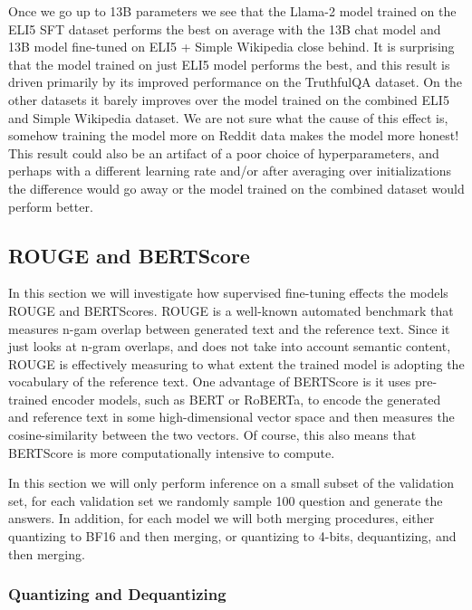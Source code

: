 \documentclass[11pt, oneside]{article}   	%
\begin{document}
Once we go up to 13B parameters we see that the Llama-2 model trained on the ELI5 SFT dataset performs the best on average with the 13B chat model and 13B model fine-tuned on ELI5 + Simple Wikipedia close behind.
It is surprising that the model trained on just ELI5 model performs the best, and this result is driven primarily by its improved performance on the TruthfulQA dataset. 
On the other datasets it barely improves over the model trained on the combined ELI5 and Simple Wikipedia dataset.
We are not sure what the cause of this effect is, somehow training the model more on Reddit data makes the model more honest!
This result could also be an artifact of a poor choice of hyperparameters, and perhaps with a different learning rate and/or after averaging over initializations the difference would go away or the model trained on the combined dataset would perform better.

\subsection{ROUGE and BERTScore}
In this section we will investigate how supervised fine-tuning effects the models ROUGE and BERTScores.
ROUGE is a well-known automated benchmark that measures n-gam overlap between generated text and the reference text.
Since it just looks at n-gram overlaps, and does not take into account semantic content, ROUGE is effectively measuring to what extent the trained model is adopting the vocabulary of the reference text.
One advantage of BERTScore is it uses pre-trained encoder models, such as BERT or RoBERTa, to encode the generated and reference text in some high-dimensional vector space and then measures the cosine-similarity between the two vectors.
Of course, this also means that BERTScore is more computationally intensive to compute.

In this section we will only perform inference on a small subset of the validation set, for each validation set we randomly sample 100 question and generate the answers.
In addition, for each model we will both merging procedures, either quantizing to BF16 and then merging, or quantizing to 4-bits, dequantizing, and then merging.

\subsubsection{Quantizing and Dequantizing}
\end{document}
